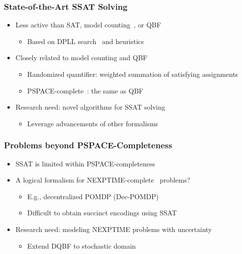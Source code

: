 \begin{frame}
      \frametitle{State-of-the-Art SSAT Solving}
      \begin{itemize}
            \item Less active than SAT, model counting~\cite{SATHandbook-ModelCounting}, or QBF
                  \pause
                  \begin{itemize}
                        \item Based on DPLL search~\cite{Davis1962} and heuristics
                              \pause
                  \end{itemize}
            \item Closely related to model counting and QBF
                  \pause
                  \begin{itemize}
                        \item Randomized quantifier: weighted summation of satisfying assignments
                              \pause
                        \item PSPACE-complete~\cite{Stockmeyer1973}: the same as QBF
                              \pause
                  \end{itemize}
            \item \alert{Research need: novel algorithms for SSAT solving}
                  \pause
                  \begin{itemize}
                        \item Leverage advancements of other formalisms
                  \end{itemize}
      \end{itemize}
\end{frame}

\begin{frame}
      \frametitle{Problems beyond PSPACE-Completeness}
      \begin{itemize}
            \item SSAT is limited within PSPACE-completeness
                  \pause
            \item A logical formalism for NEXPTIME-complete~\cite{Peterson1979} problems?
                  \pause
                  \begin{itemize}
                        \item E.g., decentralized POMDP (Dec-POMDP)~\cite{Bernstein2002}
                              \pause
                        \item Difficult to obtain succinct encodings using SSAT
                              \pause
                  \end{itemize}
            \item \alert{Research need: modeling NEXPTIME problems with uncertainty}
                  \pause
                  \begin{itemize}
                        \item Extend DQBF to stochastic domain
                  \end{itemize}
      \end{itemize}
\end{frame}

